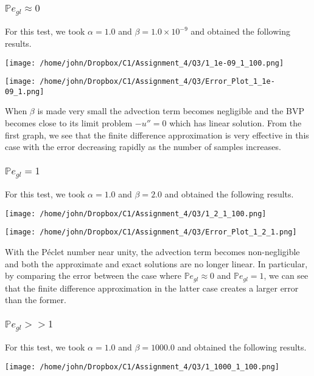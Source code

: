 \documentclass[letterpaper,12pt]{article}
\newcommand{\Prob}{\mathbb{P}}
\begin{document}
\subsubsection{ $\Prob e_{gl} \approx 0$ }

For this test, we took $\alpha = 1.0$ and  $\beta = 1.0 \times 10^{-9}$ and obtained the following results.

\centerline{\texttt{[image: /home/john/Dropbox/C1/Assignment\_4/Q3/1\_1e-09\_1\_100.png]}}

\centerline{\texttt{[image: /home/john/Dropbox/C1/Assignment\_4/Q3/Error\_Plot\_1\_1e-09\_1.png]}}

When $\beta$ is made very small the advection term becomes negligible and the BVP becomes close to its limit problem $-u'' = 0$ which has linear solution. From the first graph, we see that the finite difference approximation is very effective in this case with the error decreasing rapidly as the number of samples increases.



\subsubsection{ $\Prob e_{gl} = 1$ }

For this test, we took $\alpha = 1.0$ and  $\beta = 2.0$ and obtained the following results.


\centerline{\texttt{[image: /home/john/Dropbox/C1/Assignment\_4/Q3/1\_2\_1\_100.png]}}

\centerline{\texttt{[image: /home/john/Dropbox/C1/Assignment\_4/Q3/Error\_Plot\_1\_2\_1.png]}}

With the P\'{e}clet number near unity, the advection term becomes non-negligible and both the approximate and exact solutions are no longer linear. In particular, by comparing the error between the case where $\Prob e_{gl} \approx 0$ and $\Prob e_{gl} = 1$, we can see that the finite difference approximation in the latter case creates a larger error than the former.  


\subsubsection{ $\Prob e_{gl} >> 1$ }


For this test, we took $\alpha = 1.0$ and  $\beta = 1000.0$ and obtained the following results.


\centerline{\texttt{[image: /home/john/Dropbox/C1/Assignment\_4/Q3/1\_1000\_1\_100.png]}}
\end{document}
